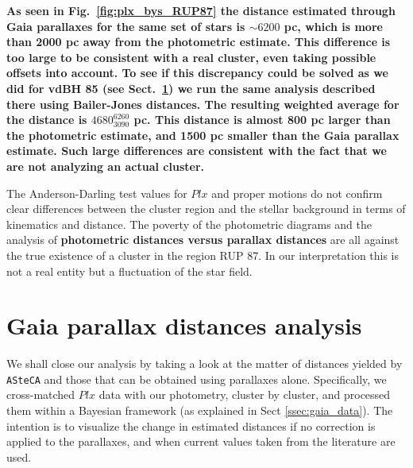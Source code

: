 \documentclass[referee]{aa}
\begin{document}
\textbf{As seen in Fig.~\ref{fig:plx_bys_RUP87} the distance estimated through
Gaia parallaxes for the same set of stars is $\sim6200$ pc, which is more
than 2000 pc away from the photometric estimate. This difference is too large to
be consistent with a real cluster, even taking possible offsets into account.
To see if this discrepancy could be solved as we did for vdBH 85 (see
Sect.~\ref{sec:gaia_distances}) we run the same analysis described there using
Bailer-Jones distances. The resulting weighted average for the
distance is $4680_{3090}^{6260}$ pc. This distance is almost 800 pc larger
than the photometric estimate, and 1500 pc smaller than the Gaia parallax
estimate. Such large differences are consistent with the fact that we are not
analyzing an actual cluster.
}

The Anderson-Darling test values for $Plx$ and proper motions do not confirm
clear differences between the cluster region and the stellar background in
terms of kinematics and distance. The poverty of the photometric diagrams and
the analysis of \textbf{photometric distances versus parallax distances}
are all against the true existence of a cluster in the region RUP 87.
In our interpretation this is not a real entity but a fluctuation of the star
field.





\section{Gaia parallax distances analysis}
\label{sec:gaia_distances}




We shall close our analysis by taking a look at the matter of distances yielded
by \texttt{ASteCA} and those that can be obtained using parallaxes alone.
Specifically, we cross-matched $Plx$ data with our photometry, cluster by
cluster, and processed them within a Bayesian framework (as explained in Sect
\ref{ssec:gaia_data}). The intention is to visualize the change in estimated
distances if no correction is applied to the parallaxes, and when current
values taken from the literature are used.\\
\end{document}
